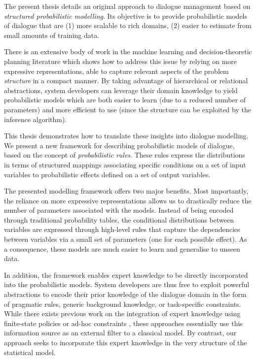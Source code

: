 The present thesis details an original approach to dialogue management based on \textit{structured probabilistic modelling}.  Its objective is to provide probabilistic models of dialogue that are (1) more scalable to rich domains, (2) easier to estimate from small amounts of training data.

There is an extensive body of work in the machine learning and decision-theoretic planning literature which shows how to address this issue by relying on more expressive representations, able to capture relevant aspects of the problem \textit{structure} in a compact manner. By taking advantage of hierarchical or relational abstractions, system developers can leverage their domain knowledge to yield probabilistic models which are both easier to learn (due to a reduced number of parameters) and more efficient to use (since the structure can be exploited by the inference algorithm).

This thesis demonstrates how to translate these insights into dialogue modelling. We present a new framework for describing probabilistic models of dialogue, based on the concept of \textit{probabilistic rules}.  These rules express the distributions in terms of structured mappings associating specific conditions on a set of input variables to probabilistic effects defined on a set of output variables. 

The presented modelling framework offers two major benefits. Most importantly, the reliance on more expressive representations allows us to drastically reduce the number of parameters associated with the models.  Instead of being encoded through traditional probability tables, the conditional distributions between variables are expressed through high-level rules that capture the dependencies between variables via a small set of parameters (one for each possible effect). As a consequence, these models are much easier to learn and generalise to unseen data. 

In addition, the framework enables expert knowledge to be directly incorporated into the probabilistic models. System developers are thus free to exploit powerful abstractions to encode their prior knowledge of the dialogue domain in the form of pragmatic rules, generic background knowledge, or task-specific constraints.  While there exists previous work on the integration of expert knowledge using finite-state policies or ad-hoc constraints \citep{heeman2007,williams2008}, these approaches essentially use this information source as an external filter to a classical model.  By contrast, our approach seeks to incorporate this expert knowledge in the very structure of the statistical model.

